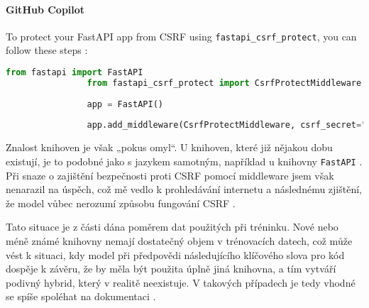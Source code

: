 \documentclass[FM,DP]{tulthesis}
\begin{document}
		\vspace{0.6em}
		\begin{tcolorbox}[colback=white,colframe=black,title=Implementace CSRF v Pythonu]
			\paragraph{GitHub Copilot}
			To protect your FastAPI app from CSRF using \verb|fastapi_csrf_protect|, you can follow these steps \cite{middleware}:
			
			\begin{lstlisting}[language=Python]
				from fastapi import FastAPI
				from fastapi_csrf_protect import CsrfProtectMiddleware
				
				app = FastAPI()
				
				app.add_middleware(CsrfProtectMiddleware, csrf_secret="your_secret_key")
			\end{lstlisting}
		\end{tcolorbox}
		
		Znalost knihoven je však „pokus omyl“. U knihoven, které již nějakou dobu existují, je to podobné jako s jazykem samotným, například u knihovny \verb|FastAPI| \cite{fastapi}. Při snaze o zajištění bezpečnosti proti CSRF pomocí middleware jsem však nenarazil na úspěch, což mě vedlo k prohledávání internetu a následnému zjištění, že model vůbec nerozumí způsobu fungování CSRF \cite{csrf} \cite{csrf_web}.
		
		Tato situace je z části dána poměrem dat použitých při tréninku. Nové nebo méně známé knihovny nemají dostatečný objem v trénovacích datech, což může vést k situaci, kdy model při předpovědi následujícího klíčového slova pro kód dospěje k závěru, že by měla být použita úplně jiná knihovna, a tím vytváří podivný hybrid, který v realitě neexistuje. V takových případech je tedy vhodné se spíše spoléhat na dokumentaci \cite{chinchilla}.
		
\end{document}

